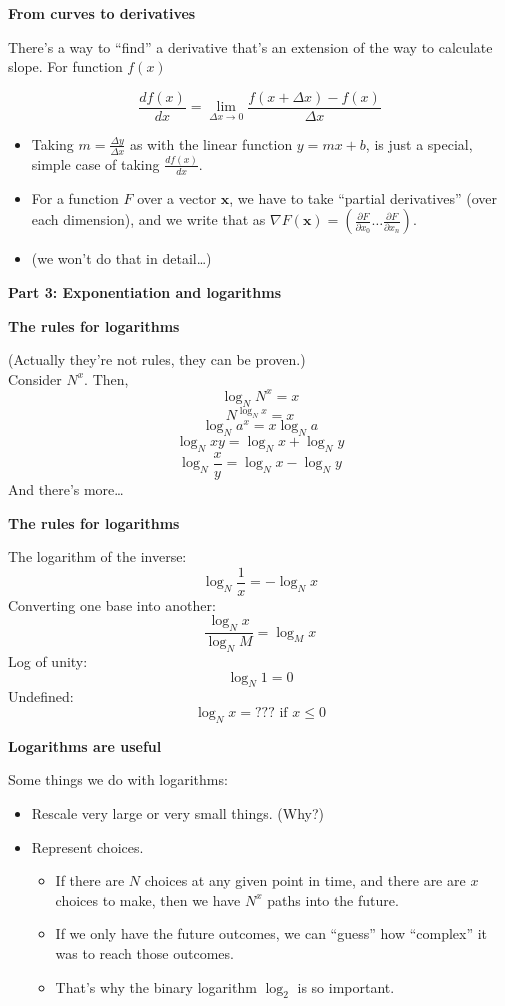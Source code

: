 \documentclass{beamer}
\newcommand{\placard}[1]{
  \begin{frame}
    \begin{center}
      \huge
      \textbf{#1}
    \end{center}
  \end{frame}
}
\newcommand{\pagestepalt}[2]{
  \begin{frame}[t]
    \begin{minipage}[t][0.26\textheight][t]{\textwidth}
      \begin{center}
        \huge
        \textbf{#1}
      \end{center}
    \end{minipage}
    
    \begin{minipage}[t][0.7\textheight][c]{\textwidth}
      #2
    \end{minipage}
  \end{frame}
}
\begin{document}
\pagestepalt{From curves to derivatives}{
  There's a way to ``find'' a derivative that's an extension of the way
  to calculate slope. For function $f(x)$
  \begin{block}{}
    \[\frac{df(x)}{dx} = \lim_{\Delta x \rightarrow 0} \frac{f(x + \Delta x) - f(x)}{\Delta x}\]
  \end{block}\pause
  \begin{itemize}
  \item Taking $m =\frac{\Delta y}{\Delta x}$ as with the linear function
    $y=mx+b$, is just a special,
    simple case of taking $\frac{df(x)}{dx}$. \pause
  \item For a function $F$ over a vector $\mathbf{x}$, we have to take
    ``partial derivatives'' (over each dimension), and we write that as $\nabla F(\mathbf{x}) = (\frac{\partial F}{\partial x_0} \ldots \frac{\partial F}{\partial x_n})$.\pause
  \item (we won't do that in detail\ldots)
  \end{itemize}
}

\placard{Part 3: Exponentiation and logarithms}

\pagestepalt{The rules for logarithms}{
  \vspace{-1cm}
  (Actually they're not rules, they can be proven.)\pause\\
  Consider $N^x$. \pause Then,
  \[\log_N N^x = x\]\pause
  \[N^{\log_N x} = x\]\pause
  \[\log_N a^x = x \log_N a \] \pause
  \[\log_N xy = \log_N x + \log_N y\]\pause
  \[\log_N \frac{x}{y} = \log_N x - \log_N y\]\pause
  And there's more\ldots
}

\pagestepalt{The rules for logarithms}{
  The logarithm of the inverse:
  \[\log_N \frac{1}{x} = -\log_N x\]\pause
  Converting one base into another:
  \[\frac{\log_N x}{\log_N M} = \log_M x\]\pause
  Log of unity:
  \[\log_N 1 = 0\]\pause
  Undefined:
  \[\log_N x = \text{??? if } x \leq 0\]
}

\pagestepalt{Logarithms are useful}{
  Some things we do with logarithms:\pause
  \begin{itemize}
  \item Rescale very large or very small things. (Why?)\pause
  \item Represent choices.\pause
    \begin{itemize}
    \item If there are $N$ choices at any given point in time, and there are are $x$ choices to make, then we have $N^x$ paths into the future.\pause
    \item If we only have the future outcomes, we can ``guess'' how ``complex'' it was to reach those outcomes.\pause
    \item That's why the binary logarithm $\log_2$ is so important.
    \end{itemize}
  \end{itemize}
}
\end{document}
